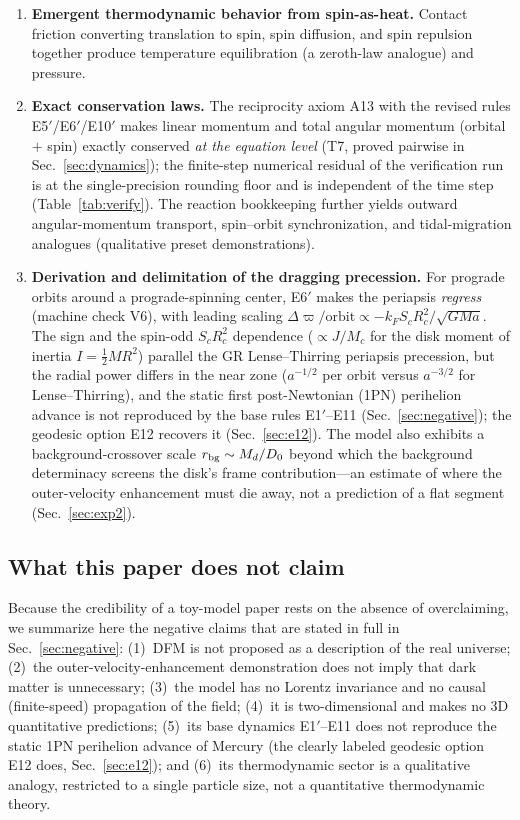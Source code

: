 \documentclass[aps,reprint,amsmath,amssymb,nofootinbib,superscriptaddress,floatfix]{revtex4-2}
\newcommand{\Dz}{D_0}
\begin{document}
\begin{enumerate}
\item[C6.]{\bf Emergent thermodynamic behavior from spin-as-heat.}
Contact friction converting translation to spin, spin diffusion, and
spin repulsion together produce temperature equilibration (a
zeroth-law analogue) and pressure.

\item[C7.]{\bf Exact conservation laws.}
The reciprocity axiom A13 with the revised rules E5$'$/E6$'$/E10$'$
makes linear momentum and total angular momentum (orbital $+$ spin)
exactly conserved \emph{at the equation level} (T7, proved pairwise in
Sec.~\ref{sec:dynamics}); the finite-step numerical residual of the
verification run is at the single-precision rounding floor and is
independent of the time step (Table~\ref{tab:verify}).
The reaction bookkeeping further yields outward angular-momentum
transport, spin--orbit synchronization, and tidal-migration analogues
(qualitative preset demonstrations).

\item[C8.]{\bf Derivation and delimitation of the dragging precession.}
For prograde orbits around a prograde-spinning center, E6$'$ makes the
periapsis \emph{regress} (machine check V6), with leading scaling
$\Delta\varpi/\mathrm{orbit} \propto -k_F S_c R_c^2/\sqrt{GMa}$.
The sign and the spin-odd $S_cR_c^2$ dependence ($\propto J/M_c$ for
the disk moment of inertia $I = \tfrac12 M R^2$) parallel the GR
Lense--Thirring periapsis precession, but the radial power
differs in the near zone ($a^{-1/2}$ per orbit versus $a^{-3/2}$ for
Lense--Thirring), and the static first post-Newtonian (1PN) perihelion
advance is not reproduced by the base rules E1$'$--E11
(Sec.~\ref{sec:negative}); the geodesic option E12 recovers it
(Sec.~\ref{sec:e12}).
The model also exhibits a background-crossover scale
$r_{\rm bg} \sim M_d/\Dz$ beyond which the background determinacy
screens the disk's frame contribution---an estimate of where the
outer-velocity enhancement must die away, not a prediction of a flat
segment (Sec.~\ref{sec:exp2}).
\end{enumerate}

\subsection{What this paper does not claim}
\label{sec:nc-summary}

Because the credibility of a toy-model paper rests on the absence of
overclaiming, we summarize here the negative claims that are stated in
full in Sec.~\ref{sec:negative}:
(1)~DFM is not proposed as a description of the real universe;
(2)~the outer-velocity-enhancement demonstration does not imply that
dark matter is unnecessary;
(3)~the model has no Lorentz invariance and no causal (finite-speed)
propagation of the field;
(4)~it is two-dimensional and makes no 3D quantitative predictions;
(5)~its base dynamics E1$'$--E11 does not reproduce the static 1PN
perihelion advance of Mercury (the clearly labeled geodesic option E12
does, Sec.~\ref{sec:e12}); and
(6)~its thermodynamic sector is a qualitative analogy, restricted to
a single particle size, not a quantitative thermodynamic theory.
\end{document}
